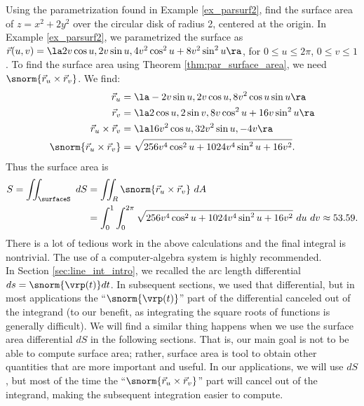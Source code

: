 {Using the parametrization found in Example \ref{ex_parsurf2}, find the surface area of $z=x^2+2y^2$ over the circular disk of radius 2, centered at the origin.
}
{In Example \ref{ex_parsurf2}, we parametrized the surface as $\vec r(u,v) = \la 2v\cos u, 2v\sin u, 4v^2\cos^2u+8v^2\sin^2u\ra$, for $0\leq u\leq 2\pi$, $0\leq v\leq 1$. To find the surface area using Theorem \ref{thm:par_surface_area}, we need $\snorm{\vec r_u\times\vec r_v}$. We find:
\begin{align*}
\vec r_u &= \la -2v\sin u, 2v\cos u, 8v^2\cos u\sin u\ra\\
\vec r_v &= \la 2\cos u, 2\sin v, 8v\cos^2 u+16v\sin^2u\ra\\
\vec r_u\times\vec r_v &= \la 16v^2\cos u, 32v^2\sin u, -4v\ra\\
\snorm{\vec r_u\times\vec r_v} &= \sqrt{256v^4\cos^2u+1024v^4\sin^2u+16v^2}.
\end{align*}
Thus the surface area is
\begin{align*}
S = \iint_\surfaceS \ dS &= \iint_R\snorm{\vec r_u\times \vec r_v}\ dA \\
& = \int_0^1\int_0^{2\pi} \sqrt{256v^4\cos^2u+1024v^4\sin^2u+16v^2}\ du\ dv \approx 53.59.
\end{align*}
There is a lot of tedious work in the above calculations and the final integral is nontrivial. The use of a computer-algebra system is highly recommended.
}\\

In Section \ref{sec:line_int_intro}, we recalled the arc length differential $ds=\snorm{\vrp(t)}dt$. In subsequent sections, we used that differential, but in most applications the ``$\snorm{\vrp(t)}$'' part of the differential canceled out of the integrand (to our benefit, as integrating the square roots of functions is generally difficult). We will find a similar thing happens when we use the surface area differential $dS$ in the following sections. That is, our main goal is not to be able to compute surface area; rather, surface area is tool to obtain other quantities that are more important and useful. In our applications, we will use $dS$, but most of the time the ``$\snorm{\vec r_u\times \vec r_v}$'' part will cancel out of the integrand, making the subsequent integration easier to compute.

